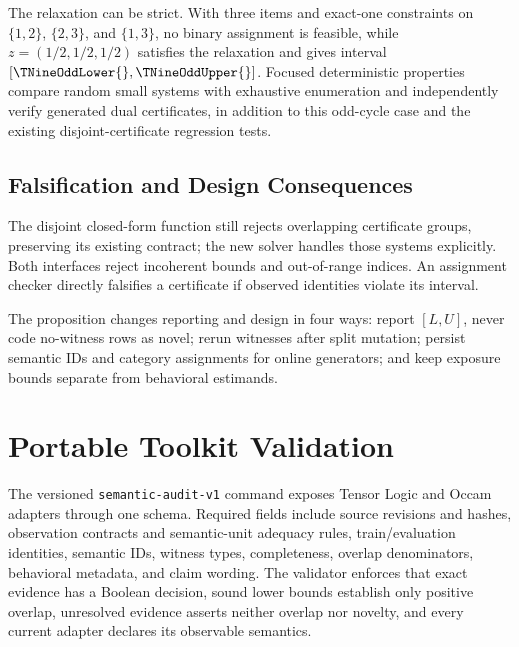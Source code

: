 The relaxation can be strict.  With three items and exact-one constraints on
$\{1,2\}$, $\{2,3\}$, and $\{1,3\}$, no binary assignment is feasible, while
$z=(1/2,1/2,1/2)$ satisfies the relaxation and gives interval
$[\TNineOddLower{},\TNineOddUpper{}]$.
Focused deterministic properties compare \TNineMilpCases{} random small
systems with exhaustive enumeration and independently verify
\TNineDualCases{} generated dual certificates, in addition to this odd-cycle
case and the existing disjoint-certificate regression tests.

\subsection{Falsification and Design Consequences}

The disjoint closed-form function still rejects overlapping certificate
groups, preserving its existing contract; the new solver handles those
systems explicitly.  Both interfaces reject incoherent bounds and
out-of-range indices.  An assignment checker directly falsifies a certificate
if observed identities violate its interval.

The proposition changes reporting and design in four ways: report
\([L,U]\), never code no-witness rows as novel; rerun witnesses after split
mutation; persist semantic IDs and category assignments for online
generators; and keep exposure bounds separate from behavioral estimands.

\section{Portable Toolkit Validation}
\label{app:assurance}

The versioned \texttt{semantic-audit-v1} command exposes Tensor Logic and
Occam adapters through one schema.  Required fields include source revisions
and hashes, observation contracts and semantic-unit adequacy rules,
train/evaluation identities, semantic IDs, witness types, completeness,
overlap denominators, behavioral metadata, and claim wording.  The validator
enforces that exact evidence has a Boolean decision, sound lower bounds
establish only positive overlap, unresolved evidence asserts neither overlap
nor novelty, and every current adapter declares its observable semantics.

